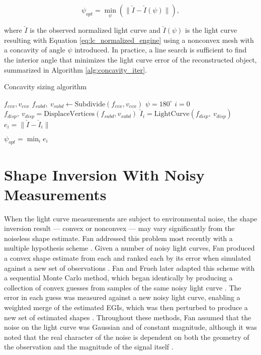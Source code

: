\begin{equation} \label{eq:psi_opt}
  \psi_{opt} = \min_{\psi} \left( \| \check{I} - \check{I}(\psi) \| \right),
\end{equation}

where $\check{I}$ is the observed normalized light curve and $\check{I}(\psi)$ is the light curve resulting with Equation \ref{eq:lc_normalized_engine} using a nonconvex mesh with a concavity of angle $\psi$ introduced. In practice, a line search is sufficient to find the interior angle that minimizes the light curve error of the reconstructed object, summarized in Algorithm \ref{alg:concavity_iter}.

\begin{algorithm}
  \caption{Concavity sizing algorithm}\label{alg:concavity_iter}
  \begin{algorithmic}
    \State $f_{cvx},v_{cvx}$ 
    \State $f_{subd}, \:v_{subd} \gets \mathrm{Subdivide}(f_{cvx},v_{cvx})$ 
    \State $\psi = 180^\circ$ 
    \State $i = 0$ 
      \State $f_{disp}, \:v_{disp} = \mathrm{DisplaceVertices}(f_{subd},v_{subd})$
      \State $\check{I}_{i} = \mathrm{LightCurve}(f_{disp}, \:v_{disp})$
      \State $e_i = \| \check{I} - \check{I}_{i} \|$
      \State{$\psi \gets \psi + \Delta \psi$}
    \EndWhile

    $\psi_{opt} = \min_i{e_i}$
  \end{algorithmic}
\end{algorithm}

\section{Shape Inversion With Noisy Measurements}

When the light curve measurements are subject to environmental noise, the shape inversion result --- convex or nonconvex --- may vary significantly from the noiseless shape estimate. Fan addressed this problem most recently with a multiple hypothesis scheme \cite{fan2020thesis}. Given a number of noisy light curves, Fan produced a convex shape estimate from each and ranked each by its error when simulated against a new set of observations \cite{fan2020thesis}. Fan and Frueh later adapted this scheme with a sequential Monte Carlo method, which began identically by producing a collection of convex guesses from samples of the same noisy light curve \cite{fan2021}. The error in each guess was measured against a new noisy light curve, enabling a weighted merge of the estimated EGIs, which was then perturbed to produce a new set of estimated shapes \cite{fan2021}. Throughout these methods, Fan assumed that the noise on the light curve was Gaussian and of constant magnitude, although it was noted that the real character of the noise is dependent on both the geometry of the observation and the magnitude of the signal itself \cite{fan2020thesis}. 

